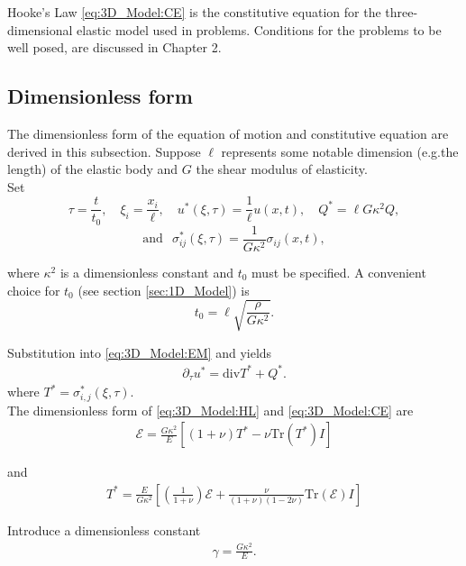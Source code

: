 \documentclass[../../main.tex]{subfiles}
\begin{document}
Hooke's Law \eqref{eq:3D_Model:CE} is the constitutive equation for the
three-dimensional elastic model used in problems. Conditions for the problems
to be well posed, are discussed in Chapter 2.

\subsection{Dimensionless form} \label{ssec:3D_Model:DimensionlessForm}
The dimensionless form of the equation of motion and constitutive equation are
derived in this subsection. Suppose $\ell$ represents some notable dimension
(e.g.the length) of the elastic body and $G$ the shear modulus of elasticity.\\

Set \[\tau = \frac{t}{t_0},\quad \xi_i = \frac{x_i}{\ell},\quad {u}^*(\xi,\tau) = \frac{1}{\ell}{u}(x,t), \quad Q^{*} = \ell G \kappa^2 Q, \]
\[ \text{and} \ \,\,\, \sigma_{ij}^*(\xi,\tau) = \frac{1}{G\kappa^2}\sigma_{ij}(x,t),\]\label{sym:t}\label{sym:G}\label{sym:tau}\label{sym:xi}\label{sym:Qstar}\label{sym:sigmaijstar}\label{sym:ell}\label{sym:kappa2}

where $\kappa^2$ is a dimensionless constant and $t_0$ must be specified. A
convenient choice for $t_0$ (see section \ref{sec:1D_Model}) is \[t_0 = \ell\sqrt{\frac{\rho}{G\kappa^2}}.\]

Substitution into \eqref{eq:3D_Model:EM} and yields
\begin{eqnarray*}
	\partial_{\tau} u^{*} = \textrm{div}T^* + Q^*.
\end{eqnarray*}
where $T^* = \sigma_{i,j}^*(\xi,\tau)$.\\

The dimensionless form of \eqref{eq:3D_Model:HL} and \eqref{eq:3D_Model:CE} are
\begin{eqnarray*}
	\mathcal{E} = \frac{G \kappa^2}{E} \left[ (1+\nu)T^* - \nu \textrm{Tr}(T^*)I \right]
\end{eqnarray*}\label{sym:I}

and
\begin{eqnarray*}
	T^* = \frac{E}{G \kappa^2} \left[\left( \frac{1}{1+\nu} \right)\mathcal{E} + \frac{\nu}{(1+\nu)(1-2\nu)}\textrm{Tr}(\mathcal{E})I \right]
\end{eqnarray*}

Introduce a dimensionless constant
\begin{eqnarray*}
	\gamma= \frac{G\kappa^2}{E}.
\end{eqnarray*}\label{sym:gamma}
\end{document}
